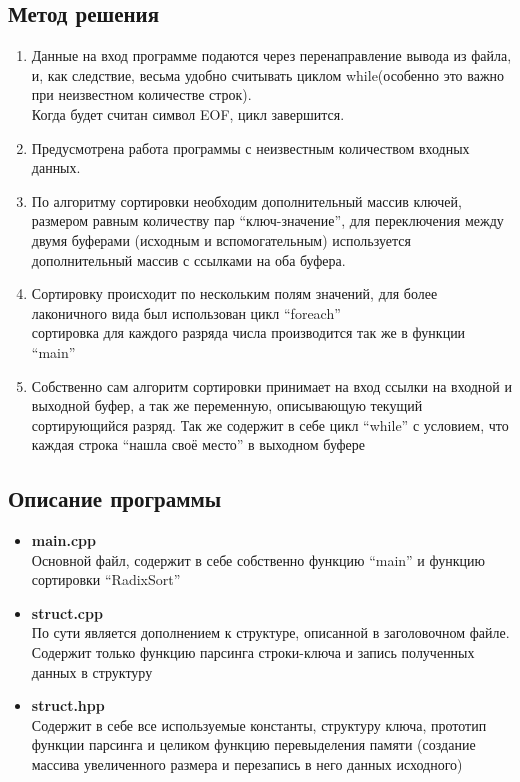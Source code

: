 \documentclass[12pt]{article}
\begin{document}
\subsection*{Метод решения}
	\begin{enumerate}
	
	\item  Данные на вход программе подаются через перенаправление вывода из файла, и, как следствие, весьма удобно считывать циклом while(особенно это важно при неизвестном количестве строк).\\ Когда будет считан символ EOF, цикл завершится.
	
	
	\item Предусмотрена работа программы с неизвестным количеством входных данных.

	
	\item По алгоритму сортировки необходим дополнительный массив ключей, размером равным количеству пар ``ключ-значение'', для переключения между двумя буферами (исходным и вспомогательным) используется дополнительный массив с ссылками на оба буфера. 
		
	\item Сортировку происходит по нескольким полям значений, для более лаконичного вида был использован цикл ``foreach''\\
	сортировка для каждого разряда числа производится так же в функции 	``main''
	
	\item Собственно сам алгоритм сортировки принимает на вход ссылки на входной и выходной буфер, а так же переменную, описывающую текущий сортирующийся разряд. Так же содержит в себе цикл ``while'' с условием, что каждая строка ``нашла своё место'' в выходном буфере
\end{enumerate}


\subsection*{Описание программы}

\begin{itemize}
	\item \textbf{main.cpp}\\ 
	Основной файл, содержит в себе собственно функцию ``main'' и функцию сортировки ``RadixSort''
	\item \textbf{struct.cpp}\\
	По сути является дополнением к структуре, описанной в заголовочном файле. Содержит только функцию парсинга строки-ключа и запись полученных данных в структуру
	\item \textbf{struct.hpp}\\
	Содержит в себе все используемые константы, структуру ключа, прототип функции парсинга и целиком функцию перевыделения памяти (создание массива увеличенного  размера и перезапись в него данных исходного)
\end{itemize}
\end{document}
